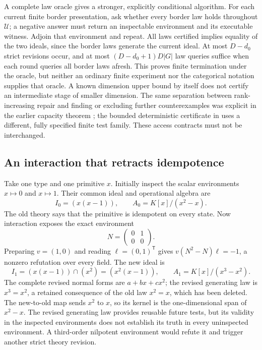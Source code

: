 \documentclass[11pt]{article}
\theoremstyle{definition}
\theoremstyle{remark}\newtheorem{remark}[theorem]{Remark}
\begin{document}
A complete law oracle gives a stronger, explicitly conditional algorithm.
For each current finite border presentation, ask whether every border law
holds throughout $\mathcal U$; a negative answer must return an inspectable
environment and its executable witness. Adjoin that environment and repeat.
All laws certified implies equality of the two ideals, since the border
laws generate the current ideal. At most $D-d_0$ strict revisions occur,
and at most $(D-d_0+1)D|G|$ law queries suffice when each round queries all
border laws afresh. This proves finite termination under the oracle, but
neither an ordinary finite experiment nor the categorical notation supplies
that oracle. A known dimension upper bound by itself does not certify an
intermediate stage of smaller dimension. The same separation between
rank-increasing repair and finding or excluding further counterexamples
was explicit in the earlier capacity theorem \cite{capacity-note}; the
bounded deterministic certificate in \cite{observation-note} uses a
different, fully specified finite test family. These access contracts
must not be interchanged.

\subsection{An interaction that retracts idempotence}

Take one type and one primitive $x$. Initially inspect the scalar
environments $x\mapsto0$ and $x\mapsto1$. Their common ideal and
operational algebra are
\[
 I_0=(x(x-1)),\qquad A_0=K[x]/(x^2-x).
\]
The old theory says that the primitive is idempotent on every state.
Now interaction exposes the exact environment
\[
 N=\begin{pmatrix}0&1\\0&0\end{pmatrix}.
\]
Preparing $v=(1,0)$ and reading $\ell=(0,1)^{\mathsf T}$ gives
$v(N^2-N)\ell=-1$, a nonzero refutation over every field. The new ideal is
\[
 I_1=(x(x-1))\cap(x^2)=(x^2(x-1)),
 \qquad A_1=K[x]/(x^3-x^2).
\]
The complete revised normal forms are $a+bx+cx^2$; the revised generating
law is $x^3=x^2$, a retained consequence of the old law $x^2=x$,
which has been deleted. The new-to-old map
sends $x^2$ to $x$, so its kernel is the one-dimensional span of
$x^2-x$. The revised generating law provides reusable future tests, but its validity
in the inspected environments does not establish its truth in every
uninspected environment. A third-order nilpotent environment would
refute it and trigger another strict theory revision.
\end{document}
